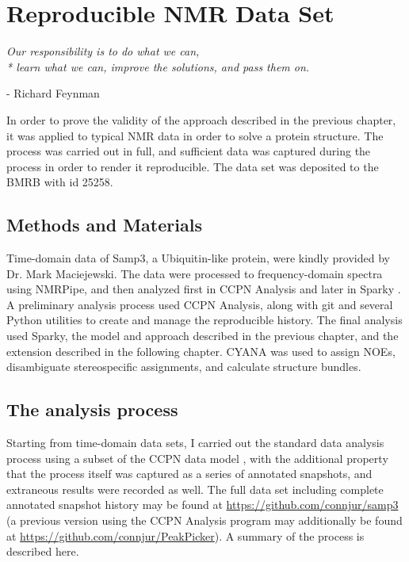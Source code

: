 \chapter{Reproducible NMR Data Set}

\begin{center}
  \textit{Our responsibility is to do what we can, \\* learn what we can, 
    improve the solutions, and pass them on.}

 - Richard Feynman
\end{center}


In order to prove the validity of the approach described in the previous
chapter, it was applied to typical NMR data in order to solve a protein
structure.  The process was carried out in full, and sufficient data was
captured during the process in order to render it reproducible.
The data set was deposited to the BMRB with id 25258.


\section{Methods and Materials}

Time-domain data of Samp3, a Ubiquitin-like protein, were kindly provided by 
Dr. Mark Maciejewski.  The data were processed to frequency-domain spectra
using NMRPipe, and then analyzed first in CCPN Analysis \cite{ccpn} and later 
in Sparky \cite{sparky}.  A preliminary analysis process used CCPN Analysis,
along with git and several Python utilities to create and manage the 
reproducible history.  The final analysis used Sparky, the model and approach
described in the previous chapter, and the extension described in the following
chapter.  CYANA was used to assign NOEs,
disambiguate stereospecific assignments, and calculate structure bundles.


\section{The analysis process}
Starting from time-domain data sets, I carried out the standard data analysis
process using a subset of the CCPN data model \cite{ccpn}, 
with the additional property that the process itself was captured as
a series of annotated snapshots, and extraneous results were recorded as well.
The full data set including complete annotated snapshot history may be found at 
\url{https://github.com/connjur/samp3}
(a previous version using the CCPN Analysis program may additionally be found
at \url{https://github.com/connjur/PeakPicker}).
A summary of the process is described here.

